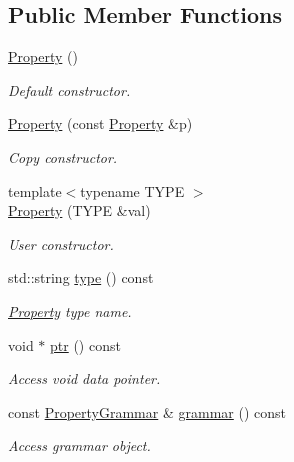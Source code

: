 \subsection*{Public Member Functions}
\begin{DoxyCompactItemize}
\item 
\hyperlink{class_d_d4hep_1_1_property_ab029377b86e5b8ae7513bf93f9c9a955}{Property} ()
\begin{DoxyCompactList}\small\item\em Default constructor. \item\end{DoxyCompactList}\item 
\hyperlink{class_d_d4hep_1_1_property_a357f17ec828b8fda35378db74fd3a830}{Property} (const \hyperlink{class_d_d4hep_1_1_property}{Property} \&p)
\begin{DoxyCompactList}\small\item\em Copy constructor. \item\end{DoxyCompactList}\item 
{\footnotesize template$<$typename TYPE $>$ }\\\hyperlink{class_d_d4hep_1_1_property_a17226fd5a43561fae28b9a343f410c49}{Property} (TYPE \&val)
\begin{DoxyCompactList}\small\item\em User constructor. \item\end{DoxyCompactList}\item 
std::string \hyperlink{class_d_d4hep_1_1_property_a381f22fbb525bd5d039258b126d63276}{type} () const 
\begin{DoxyCompactList}\small\item\em \hyperlink{class_d_d4hep_1_1_property}{Property} type name. \item\end{DoxyCompactList}\item 
void $\ast$ \hyperlink{class_d_d4hep_1_1_property_a45508a845f738435f49d680837e77619}{ptr} () const 
\begin{DoxyCompactList}\small\item\em Access void data pointer. \item\end{DoxyCompactList}\item 
const \hyperlink{class_d_d4hep_1_1_property_grammar}{PropertyGrammar} \& \hyperlink{class_d_d4hep_1_1_property_ac9688a8f6daf76e38d9cce39e649512b}{grammar} () const 
\begin{DoxyCompactList}\small\item\em Access grammar object. \item\end{DoxyCompactList}\item 

\end{DoxyCompactItemize}
